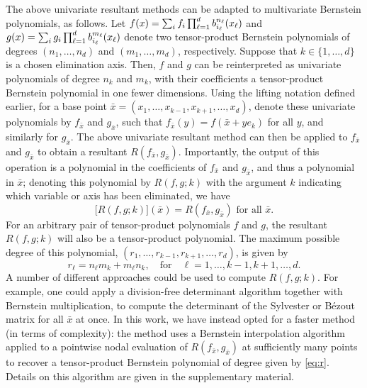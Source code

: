 \documentclass[onefignum,onetabnum,onealgnum,oneeqnum]{siamart190516}
\begin{document}
The above univariate resultant methods can be adapted to multivariate Bernstein polynomials, as follows. Let $f(x) = \smash{\sum_i f_i \prod_{\ell=1}^d b_{i_\ell}^{n_\ell} (x_\ell)}$ and $g(x) = \smash{\sum_i g_i \prod_{\ell=1}^d b_{i_\ell}^{m_\ell} (x_\ell)}$ denote two tensor-product Bernstein polynomials of degrees $(n_1,\ldots,n_d)$ and $(m_1,\ldots,m_d)$, respectively. Suppose that $k \in \{1, \ldots, d\}$ is a chosen elimination axis. Then, $f$ and $g$ can be reinterpreted as univariate polynomials of degree $n_k$ and $m_k$, with their coefficients a tensor-product Bernstein polynomial in one fewer dimensions. Using the lifting notation defined earlier, for a base point $\bar x = (x_1, \ldots, x_{k-1},x_{k+1},\ldots,x_d)$, denote these univariate polynomials by $f_{\bar x}$ and $g_{\bar x}$, such that $f_{\bar x}(y) = f(\bar x + y e_k)$ for all $y$, and similarly for $g_{\bar x}$. The above univariate resultant method can then be applied to $f_{\bar x}$ and $g_{\bar x}$ to obtain a resultant $R(f_{\bar x}, g_{\bar x})$. Importantly, the output of this operation is a polynomial in the coefficients of $f_{\bar x}$ and $g_{\bar x}$, and thus a polynomial in $\bar x$; denoting this polynomial by $R(f,g; k)$ with the argument $k$ indicating which variable or axis has been eliminated, we have
\begin{equation} \label{eq:resultant1d} \bigl[R(f, g; k)\bigr] (\bar x) = R(f_{\bar x}, g_{\bar x}) \text{ for all } \bar x. \end{equation}
For an arbitrary pair of tensor-product polynomials $f$ and $g$, the resultant $R(f,g;k)$ will also be a tensor-product polynomial. The maximum possible degree of this polynomial, $(r_1, \ldots, r_{k-1}, r_{k+1}, \ldots, r_d)$, is given by
\begin{equation} \label{eq:r} r_\ell = n_\ell m_k + m_\ell n_k, \quad \text{for} \quad \ell = 1, \ldots, k-1, k+1, \ldots, d. \end{equation}
A number of different approaches could be used to compute $R(f,g;k)$. For example, one could apply a division-free determinant algorithm together with Bernstein multiplication, to compute the determinant of the Sylvester or B\'ezout matrix for all $\bar x$ at once. In this work, we have instead opted for a faster method (in terms of complexity): the method uses a Bernstein interpolation algorithm applied to a pointwise nodal evaluation of $R(f_{\bar x}, g_{\bar x})$ at sufficiently many points to recover a tensor-product Bernstein polynomial of degree given by \eqref{eq:r}. Details on this algorithm are given in the supplementary material.
\end{document}

